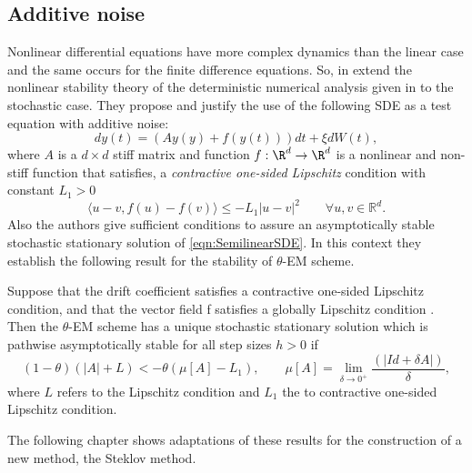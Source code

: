 \subsection*{Additive noise}
		Nonlinear differential equations have more complex  dynamics than the linear case and
	the same  occurs for the finite difference equations. So,  \citeauthor*{Caraballo2006} in
	\cite{Caraballo2006}  extend the nonlinear stability theory of the deterministic
	numerical  analysis given in \cite{kloeden1999towards} to the stochastic
	case. They propose and justify the use of the following SDE as a test equation with additive noise:
	\begin{equation}\label{eqn:SemilinearSDE}
		dy(t)=\left(Ay(y)+f(y(t))\right)dt+\xi dW(t),
	\end{equation}
	where $A$ is a $d \times d$ stiff matrix and function $f : \R^d \to \R^d $ is a nonlinear and non-stiff function 
	that satisfies, a
	{\it contractive one-sided Lipschitz} condition with constant
	$L_1>0$
	\begin{equation}\label{cl}
		\langle
			u - v,f(u)-f(v)
		\rangle\leq
		-L_1|u-v|^2\qquad \forall u,v\in \mathbb{R}^d.
	\end{equation}
Also the authors give sufficient conditions to assure an asymptotically stable stochastic stationary solution
of \eqref{eqn:SemilinearSDE}. In this context they establish the following result for the stability of $\theta$-EM 
scheme.
\begin{thm}
	Suppose that the drift coefficient satisfies a contractive one-sided Lipschitz condition, and that the vector field 
	f satisfies a globally Lipschitz condition . Then the $\theta$-EM scheme has a unique stochastic stationary 
	solution 
	which is pathwise asymptotically stable for all step sizes $h> 0$
	if
	$$
		(1-\theta) (|A|+L) <-\theta (\mu[A] - L_1),
		\qquad
		\mu[A] = \lim_{\delta \to 0^+} \frac{(|Id + \delta A|)}{\delta},
	$$
	where $L$ refers to the Lipschitz condition and $L_1$  the to contractive one-sided Lipschitz condition.
\end{thm}












The following chapter shows adaptations of these results for the construction of a new method, the Steklov method.
